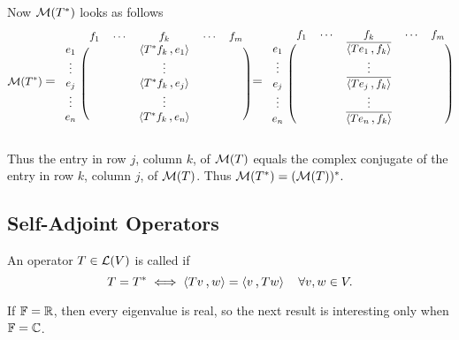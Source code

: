 \begin{prf}
  Now $\mathcal{M}(T^*)$ looks as follows
  \[
  \mmatrix(T^*)
  \;\mathlarger{=}\;
  \begin{blockarray}{cccccc}
    & f_1 & \cdots &  f_k      & \cdots & f_m \\
    \begin{block}{c(ccccc)}
      e_1    &  &  & \ip{T^* f_k}{e_1} & & \\
      \vdots &  &  & \vdots            & & \\
      e_j    &  &  & \ip{T^* f_k}{e_j} & & \\
      \vdots &  &  & \vdots            & & \\
      e_n    &  &  & \ip{T^* f_k}{e_n} & & \\
    \end{block}
  \end{blockarray}
  \;\mathlarger{=}\;
  \begin{blockarray}{cccccc}
    & f_1 & \cdots &  f_k      & \cdots & f_m \\
    \begin{block}{c(ccccc)}
      e_1    &  &  & \overline{\ip{T e_1}{f_k}} & & \\
      \vdots &  &  & \vdots            & & \\
      e_j    &  &  & \overline{\ip{T e_j}{f_k}} & & \\
      \vdots &  &  & \vdots            & & \\
      e_n    &  &  & \overline{\ip{T e_n}{f_k}} & & \\
    \end{block}
  \end{blockarray}
  \]


  Thus the entry in row $j$, column $k$, of $\mathcal{M}(T)$ equals the complex conjugate of the entry in row $k$, column $j$, of $\mathcal{M}(T)$. Thus
    $\mathcal{M}(T^*) = (\mathcal{M}(T))^*.$
\end{prf}

\subsection{Self-Adjoint Operators}

\begin{mydef}
  An operator $T \in \mathcal{L}(V)$ is called  if
  \[
    T = T^* \iff \ip{Tv}{w} = \ip{v}{Tw} \quad \forall v,w \in V.
  \]
\end{mydef}

If $\mathbb{F} = \mathbb{R}$, then every eigenvalue is real, so the next result is interesting only when $\mathbb{F} = \mathbb{C}$.

